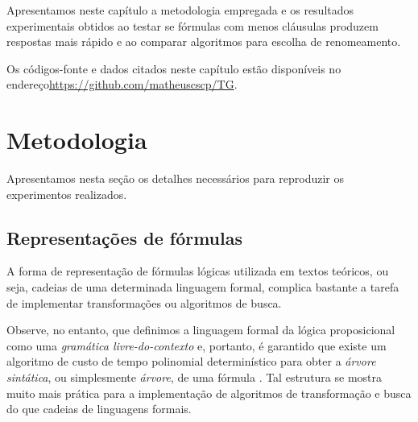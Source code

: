 
\label{cap_resultados}

\indent

Apresentamos neste capítulo a metodologia empregada e os resultados experimentais obtidos ao testar se fórmulas com menos cláusulas produzem respostas mais rápido e ao comparar algoritmos para escolha de renomeamento.

Os códigos-fonte e dados citados neste capítulo estão disponíveis no endereço\break \url{https://github.com/matheuscscp/TG}.

\section{Metodologia}

\indent

Apresentamos nesta seção os detalhes necessários para reproduzir os experimentos realizados.

\subsection{Representações de fórmulas}

\indent

A forma de representação de fórmulas lógicas utilizada em textos teóricos, ou seja, cadeias de uma determinada linguagem formal, complica bastante a tarefa de implementar transformações ou algoritmos de busca.

Observe, no entanto, que definimos a linguagem formal da lógica proposicional como uma \emph{gramática livre-do-contexto} \cite{sipser2012introduction} e, portanto, é garantido que existe um algoritmo de custo de tempo polinomial determinístico para obter a \emph{árvore sintática}, ou simplesmente \emph{árvore}, de uma fórmula \cite{younger1967recognition}. Tal estrutura se mostra muito mais prática para a implementação de algoritmos de transformação e busca do que cadeias de linguagens formais.

